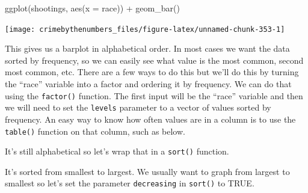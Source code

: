 \documentclass[
]{krantz}
\makeatletter
\newenvironment{Shaded}{\begin{snugshade}}{\end{snugshade}}
\newcommand{\AttributeTok}[1]{\textcolor[rgb]{0.61,0.61,0.61}{#1}}
\newcommand{\CommentTok}[1]{\textcolor[rgb]{0.37,0.37,0.37}{\textit{#1}}}
\newcommand{\FunctionTok}[1]{\textcolor[rgb]{0,0,0}{#1}}
\newcommand{\NormalTok}[1]{#1}
\newcommand{\SpecialCharTok}[1]{\textcolor[rgb]{0,0,0}{#1}}
\newenvironment{kframe}{%
\medskip{}
\setlength{\fboxsep}{.8em}
 \def\at@end@of@kframe{}%
 \ifinner\ifhmode%
  \def\at@end@of@kframe{\end{minipage}}%
  \begin{minipage}{\columnwidth}%
 \fi\fi%
 \def\FrameCommand##1{\hskip\@totalleftmargin \hskip-\fboxsep
 \colorbox{shadecolor}{##1}\hskip-\fboxsep
     \hskip-\linewidth \hskip-\@totalleftmargin \hskip\columnwidth}%
 \MakeFramed {\advance\hsize-\width
   \@totalleftmargin\z@ \linewidth\hsize
   \@setminipage}}%
 {\par\unskip\endMakeFramed%
 \at@end@of@kframe}
\renewenvironment{Shaded}{\begin{kframe}}{\end{kframe}}
\makeatother
\begin{document}
\begin{Shaded}
\begin{Highlighting}[]
\FunctionTok{ggplot}\NormalTok{(shootings, }\FunctionTok{aes}\NormalTok{(}\AttributeTok{x =}\NormalTok{ race)) }\SpecialCharTok{+} 
  \FunctionTok{geom\_bar}\NormalTok{()}
\end{Highlighting}
\end{Shaded}

\begin{center}\texttt{[image: crimebythenumbers\_files/figure-latex/unnamed-chunk-353-1]} \end{center}

This gives us a barplot in alphabetical order. In most cases we want the data sorted by frequency, so we can easily see what value is the most common, second most common, etc. There are a few ways to do this but we'll do this by turning the ``race'' variable into a factor and ordering it by frequency. We can do that using the \texttt{factor()} function. The first input will be the ``race'' variable and then we will need to set the \texttt{levels} parameter to a vector of values sorted by frequency. An easy way to know how often values are in a column is to use the \texttt{table()} function on that column, such as below.

\begin{Shaded}
\end{Shaded}

It's still alphabetical so let's wrap that in a \texttt{sort()} function.

\begin{Shaded}
\end{Shaded}

It's sorted from smallest to largest. We usually want to graph from largest to smallest so let's set the parameter \texttt{decreasing} in \texttt{sort()} to TRUE.
\end{document}
